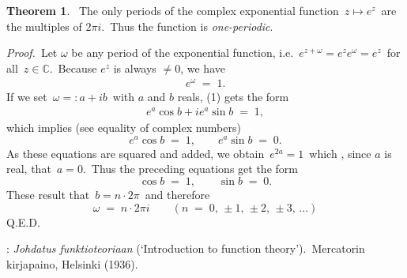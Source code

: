 \documentclass[12pt]{article}
\theoremstyle{definition}
\newtheorem*{thmplain}{Theorem}
\begin{document}
\begin{thmplain}
\, The only periods of the complex exponential function \,$z\mapsto e^z$\, are the multiples of $2\pi i$.\, Thus the function is {\em one-periodic}.
\end{thmplain}

{\em Proof.}\, Let $\omega$ be any period of the exponential function, i.e.\, $e^{z+\omega} = e^ze^\omega = e^z$\, for all\, $z\in\mathbb{C}$.\, Because $e^z$ is always $\neq 0$, we have
\begin{align}
e^\omega \;=\; 1.
\end{align}
If we set\, $\omega =: a\!+\!ib$\, with $a$ and $b$ reals, (1) gets the form
\begin{align}
e^a\cos{b}+ie^a\sin{b} \;=\; 1,
\end{align}
which implies (see equality of complex numbers)
$$e^a\cos{b} \;=\; 1,\qquad e^a\sin{b} \;=\; 0.$$
As these equations are squared and added, we obtain\, $e^{2a} = 1$\, which , since $a$ is real, that\, $a = 0$.\, Thus the preceding equations get the form 
$$\cos{b} \;=\; 1,\qquad \sin{b} \;=\; 0.$$
These result that\, $b = n\!\cdot\!2\pi$\, and therefore
$$\omega \;=\; n\!\cdot\! 2\pi i \qquad (n \;=\; 0,\,\pm 1,\,\pm 2,\,\pm 3,\,\ldots)$$
Q.E.D.

\begin{thebibliography}{8}
: {\em Johdatus funktioteoriaan} (`Introduction to function theory').\, Mercatorin kirjapaino, Helsinki (1936).
\end{thebibliography}
\end{document}
